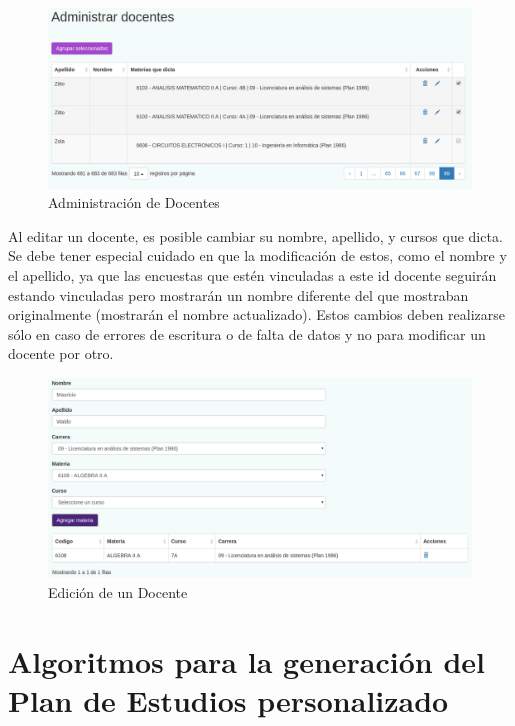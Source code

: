 \documentclass[a4paper]{article}
\begin{document}
\begin{figure}[H]
\centering
\includegraphics[scale=0.3]{Imagenes/administrar_docentes.png}\par
\caption{Administración de Docentes}
\end{figure}

Al editar un docente, es posible cambiar su nombre, apellido, y cursos que dicta. Se debe tener especial cuidado en que la modificación de estos, como el nombre y el apellido, ya que las encuestas que estén vinculadas a este id docente seguirán estando vinculadas pero mostrarán un nombre diferente del que mostraban originalmente (mostrarán el nombre actualizado). Estos cambios deben realizarse sólo en caso de errores de escritura o de falta de datos y no para modificar un docente por otro.

\begin{figure}[H]
\centering
\includegraphics[scale=0.3]{Imagenes/editar_docente.png}\par
\caption{Edición de un Docente}
\end{figure}

\newpage
\section{Algoritmos para la generación del Plan de Estudios personalizado}
\end{document}
